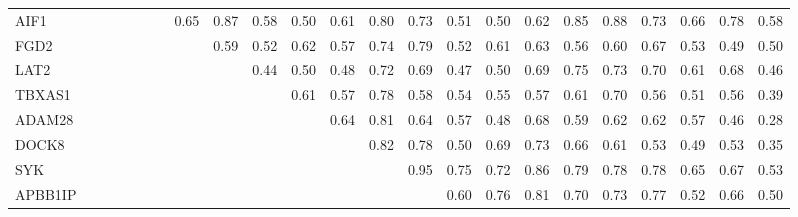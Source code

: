 \begin{longtable}{lrrrrrrrrrrrrrrrrrrrrrr}
AIF1    &            &            &              &              &             &            &       0.65 &       0.87 &         0.58 &         0.50 &        0.61 &      0.80 &          0.73 &        0.51 &       0.50 &        0.62 &     0.85 &         0.88 &        0.73 &         0.66 &        0.78 &        0.58 \\
FGD2    &            &            &              &              &             &            &            &       0.59 &         0.52 &         0.62 &        0.57 &      0.74 &          0.79 &        0.52 &       0.61 &        0.63 &     0.56 &         0.60 &        0.67 &         0.53 &        0.49 &        0.50 \\
LAT2    &            &            &              &              &             &            &            &            &         0.44 &         0.50 &        0.48 &      0.72 &          0.69 &        0.47 &       0.50 &        0.69 &     0.75 &         0.73 &        0.70 &         0.61 &        0.68 &        0.46 \\
TBXAS1  &            &            &              &              &             &            &            &            &              &         0.61 &        0.57 &      0.78 &          0.58 &        0.54 &       0.55 &        0.57 &     0.61 &         0.70 &        0.56 &         0.51 &        0.56 &        0.39 \\
ADAM28  &            &            &              &              &             &            &            &            &              &              &        0.64 &      0.81 &          0.64 &        0.57 &       0.48 &        0.68 &     0.59 &         0.62 &        0.62 &         0.57 &        0.46 &        0.28 \\
DOCK8   &            &            &              &              &             &            &            &            &              &              &             &      0.82 &          0.78 &        0.50 &       0.69 &        0.73 &     0.66 &         0.61 &        0.53 &         0.49 &        0.53 &        0.35 \\
SYK     &            &            &              &              &             &            &            &            &              &              &             &           &          0.95 &        0.75 &       0.72 &        0.86 &     0.79 &         0.78 &        0.78 &         0.65 &        0.67 &        0.53 \\
APBB1IP &            &            &              &              &             &            &            &            &              &              &             &           &               &        0.60 &       0.76 &        0.81 &     0.70 &         0.73 &        0.77 &         0.52 &        0.66 &        0.50 \\

\end{longtable}
